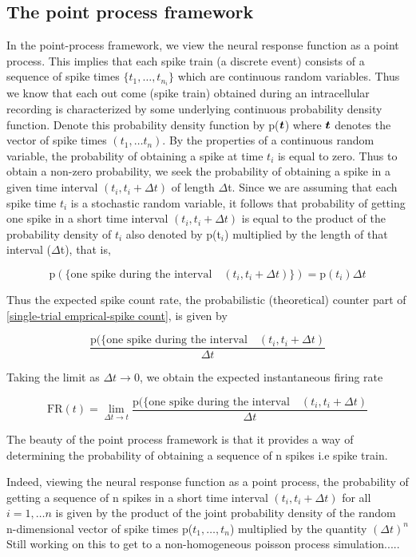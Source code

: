 \subsection{The point process framework}
In the point-process framework, we view the neural response function as a point process. This implies that each spike train (a discrete event) consists of a sequence of spike times $\{t_{1}, \ldots, t_{n_{i}} \}$ which
are continuous random variables. Thus we know that each out come (spike train)
obtained during an intracellular recording is characterized by some underlying continuous probability density function. Denote this probability density function by p($\boldsymbol{t}$) where $\boldsymbol{t}$ denotes the vector of spike times $(t_{1}, \ldots t_{n})$. By the properties of a continuous random variable, the probability of obtaining a spike at time $t_{i}$ is equal to zero. Thus to obtain a non-zero probability, we seek the probability of obtaining a spike in a given time interval $(t_{i}, t_{i}+\Delta t)$ of length $\Delta$t.
Since we are assuming that each spike time $t_{i}$ is a stochastic random variable, it follows that  probability of getting one spike in a short time interval $(t_i, t_i+\Delta t)$ is equal to the product of  the probability density of $t_{i}$ also denoted by p(t$_{i}$) multiplied by the length 
of that interval ($\Delta$t), that is,

\[
\displaystyle \text{p}(\{\text{one spike during the interval} \quad (t_{i}, t_{i}+\Delta t) \}) = \text{p}(t_{i})\Delta t  
\]

\newpage

Thus the expected spike count rate, the probabilistic (theoretical) counter part
of \eqref{single-trial emprical-spike count}, is given by

\begin{equation}\label{expected count rate}
\displaystyle 
\dfrac{\text{p}(\{\text{one spike during the interval} \quad (t_{i}, t_{i}+\Delta t)}{\Delta t} 
\end{equation}

Taking the limit as $\Delta t \rightarrow 0$, we obtain the expected instantaneous  firing rate
 
\begin{equation}\label{expected instant Firerate}
\displaystyle 
\text{FR}(t) =  \lim_{\Delta t \rightarrow t}  \dfrac{\text{p}(\{\text{one spike during the interval} \quad (t_{i}, t_{i}+\Delta t)}{\Delta t} 
\end{equation}


The beauty of the point process framework is that it provides a way of determining the probability of obtaining a sequence of n spikes i.e spike train.

Indeed, viewing the neural response function as a point process, the
probability of getting a sequence of n spikes in a short time interval
$(t_{i}, t_{i}+\Delta t)$ for all $i=1, \ldots n$ is given by the
product of the joint probability density of the random n-dimensional
vector of spike times p($t_{1}, \ldots, t_{n}$) multiplied by the quantity
$(\Delta t)^{n}$\\


Still working on this to get to a non-homogeneous poisson process simulation.....


